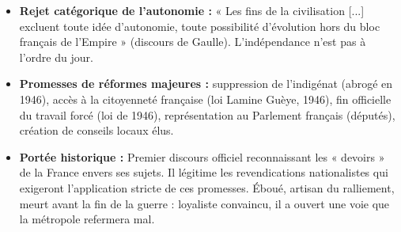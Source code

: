 \documentclass[11pt]{article}
\newcommand{\cle}[1]{{\popxbold\color{popdark}#1}}
\begin{document}
\begin{aretenir}
\begin{itemize}
    \item \textbf{Rejet catégorique de l'autonomie :} « Les fins de la civilisation [...] excluent toute idée d'autonomie, toute possibilité d'évolution hors du bloc français de l'Empire » (discours de Gaulle). L'indépendance n'est pas à l'ordre du jour.
    \item \textbf{Promesses de réformes majeures :} suppression de l'indigénat (abrogé en 1946), accès à la citoyenneté française (loi Lamine Guèye, 1946), fin officielle du \cle{travail forcé} (loi de 1946), représentation au Parlement français (députés), création de conseils locaux élus.
    \item \textbf{Portée historique :} Premier discours officiel reconnaissant les « devoirs » de la France envers ses sujets. Il légitime les revendications nationalistes qui exigeront l'application stricte de ces promesses. Éboué, artisan du ralliement, meurt avant la fin de la guerre : loyaliste convaincu, il a ouvert une voie que la métropole refermera mal.
\end{itemize}
\end{aretenir}
\end{document}
